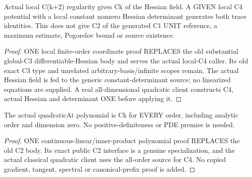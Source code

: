 \begin{lemma}
  \label{lem:classical-ma-differentials}
  \leanok
  Actual local C(k+2) regularity gives Ck of the Hessian field. A GIVEN
  local C4 potential with a local constant nonzero Hessian determinant
  generates both trace identities. This does not give C2 of the generated
  C1 UNIT reference, a maximum estimate, Pogorelov bound or source existence.
\end{lemma}
\begin{proof}
  \leanok
  ONE local finite-order coordinate proof REPLACES the old substantial
  global-C3 differentiable-Hessian body and serves the actual local-C4 caller.
  Its old exact C3 type and unrelated arbitrary-basis/infinite scopes remain.
  The actual Hessian field is fed to the generic constant-determinant source;
  no linearized equations are supplied. A real all-dimensional quadratic
  client constructs C4, actual Hessian and determinant ONE before applying it.
\end{proof}

\begin{lemma}
  \label{lem:quadratic-all-orders}
  \leanok
  The actual quadraticAt polynomial is Ck for EVERY order, including analytic
  order and dimension zero. No positive-definiteness or PDE premise is needed.
\end{lemma}
\begin{proof}
  \leanok
  ONE continuous-linear/inner-product polynomial proof REPLACES the old C2
  body. Its exact public C2 interface is a genuine specialization, and the
  actual classical quadratic client uses the all-order source for C4.
  No copied gradient, tangent, spectral or canonical-prefix proof is added.
\end{proof}


